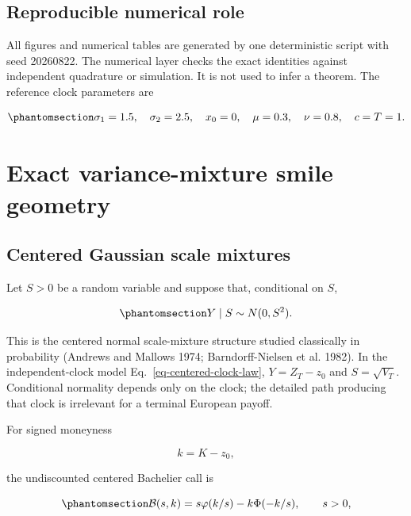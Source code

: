 \documentclass[
  english,
  11pt,
  letterpaper,
  DIV=11,
  numbers=noendperiod]{scrartcl}
\theoremstyle{plain}
\theoremstyle{plain}
\theoremstyle{plain}
\theoremstyle{plain}
\theoremstyle{remark}
\begin{document}
\subsection{Reproducible numerical
role}\label{reproducible-numerical-role}

All figures and numerical tables are generated by one deterministic
script with seed 20260822. The numerical layer checks the exact
identities against independent quadrature or simulation. It is not used
to infer a theorem. The reference clock parameters are

\begin{equation}\protect\phantomsection\label{eq-reference-parameters}{
\sigma_1=1.5,\quad
\sigma_2=2.5,\quad
x_0=0,\quad
\mu=0.3,\quad
\nu=0.8,\quad
c=T=1.
}\end{equation}

\section{Exact variance-mixture smile geometry}\label{sec-smiles}

\subsection{Centered Gaussian scale
mixtures}\label{centered-gaussian-scale-mixtures}

Let \(S>0\) be a random variable and suppose that, conditional on \(S\),

\begin{equation}\protect\phantomsection\label{eq-scale-mixture}{
Y\mid S\sim N(0,S^2).
}\end{equation}

This is the centered normal scale-mixture structure studied classically
in probability (Andrews and Mallows 1974; Barndorff-Nielsen et al.
1982). In the independent-clock model Eq.~\ref{eq-centered-clock-law},
\(Y=Z_T-z_0\) and \(S=\sqrt{V_T}\). Conditional normality depends only
on the clock; the detailed path producing that clock is irrelevant for a
terminal European payoff.

For signed moneyness

\[
k=K-z_0,
\]

the undiscounted centered Bachelier call is

\begin{equation}\protect\phantomsection\label{eq-bachelier-call}{
\mathcal B(s,k)
=s\varphi(k/s)-k\Phi(-k/s),
\qquad s>0,
}\end{equation}
\end{document}
